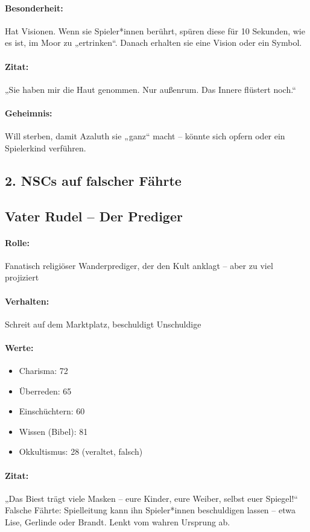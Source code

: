 \paragraph{Besonderheit:} Hat Visionen. Wenn sie Spieler*innen berührt, spüren diese für 10 Sekunden, wie es ist, im Moor zu „ertrinken“. Danach erhalten sie eine Vision oder ein Symbol.
\paragraph{Zitat:}
„Sie haben mir die Haut genommen. Nur außenrum. Das Innere flüstert noch.“
\paragraph{Geheimnis:} Will sterben, damit Azaluth sie „ganz“ macht – könnte sich opfern oder ein Spielerkind verführen.

\newpage
\subsection*{2. NSCs auf falscher Fährte}

\subsection{Vater Rudel – Der Prediger}
\paragraph{Rolle:} Fanatisch religiöser Wanderprediger, der den Kult anklagt – aber zu viel projiziert
\paragraph{Verhalten:} Schreit auf dem Marktplatz, beschuldigt Unschuldige
\paragraph{Werte:}
\begin{itemize}
\item Charisma: 72
\item Überreden: 65
\item Einschüchtern: 60
\item Wissen (Bibel): 81
\item Okkultismus: 28 (veraltet, falsch)
\end{itemize}
\paragraph{Zitat:}
„Das Biest trägt viele Masken – eure Kinder, eure Weiber, selbst euer Spiegel!“
Falsche Fährte: Spielleitung kann ihn Spieler*innen beschuldigen lassen – etwa Lise, Gerlinde oder Brandt. Lenkt vom wahren Ursprung ab.

